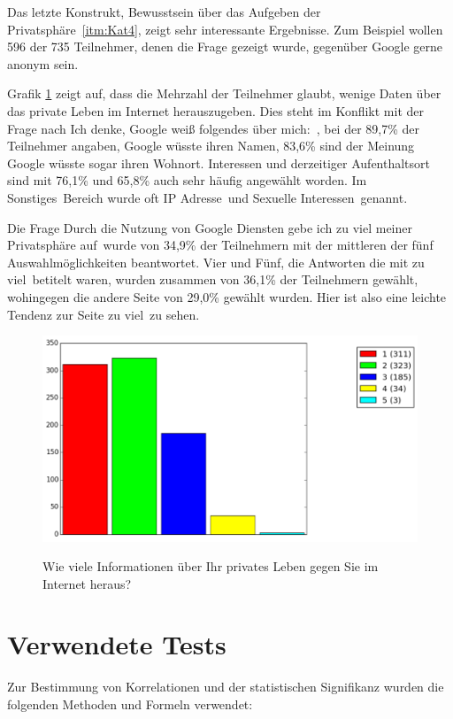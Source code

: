 Das letzte Konstrukt, \glqq Bewusstsein über das Aufgeben der Privatsphäre\grqq\ \ref{itm:Kat4}, zeigt sehr interessante Ergebnisse. Zum Beispiel wollen 596 der 735 Teilnehmer, denen die Frage gezeigt wurde, gegenüber Google gerne anonym sein.

Grafik \ref{giveinfo} zeigt auf, dass die Mehrzahl der Teilnehmer glaubt, wenige Daten über das private Leben im Internet herauszugeben. Dies steht im Konflikt mit der Frage nach \glqq Ich denke, Google weiß folgendes über mich:\grqq\ , bei der 89,7\% der Teilnehmer angaben, Google wüsste ihren Namen, 83,6\% sind der Meinung Google wüsste sogar ihren Wohnort. Interessen und derzeitiger Aufenthaltsort sind mit 76,1\% und 65,8\% auch sehr häufig angewählt worden. Im \glqq Sonstiges\grqq\ Bereich wurde oft \glqq IP Adresse\grqq\ und \glqq Sexuelle Interessen\grqq\ genannt.

Die Frage \glqq Durch die Nutzung von Google Diensten gebe ich zu viel meiner Privatsphäre auf\grqq\ wurde von 34,9\% der Teilnehmern mit der mittleren der fünf Auswahlmöglichkeiten beantwortet. Vier und Fünf, die Antworten die mit \glqq zu viel\grqq\ betitelt waren, wurden zusammen von 36,1\% der Teilnehmern gewählt, wohingegen die andere Seite von 29,0\% gewählt wurden. Hier ist also eine leichte Tendenz zur Seite \glqq zu viel\grqq\ zu sehen.

\begin{figure}[H]
\centering
\includegraphics[scale=0.55]{images/giveinfo}\\
\caption{Wie viele Informationen über Ihr privates Leben gegen Sie im Internet heraus?}\label{giveinfo}
\end{figure}

\section{Verwendete Tests}
Zur Bestimmung von Korrelationen und der statistischen Signifikanz wurden die folgenden Methoden und Formeln verwendet:

